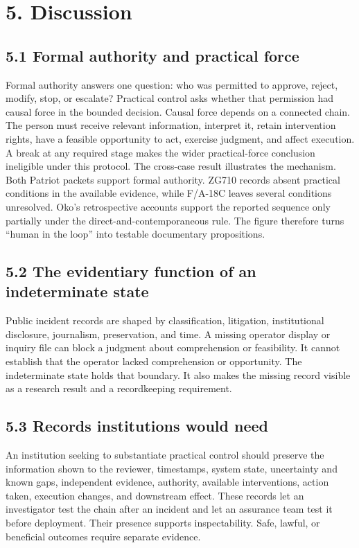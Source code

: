 \documentclass[11pt]{article}
\begin{document}
\section*{5. Discussion}
\subsection*{5.1 Formal authority and practical force}
Formal authority answers one question: who was permitted to approve, reject, modify, stop, or escalate? Practical control asks whether that permission had causal force in the bounded decision. Causal force depends on a connected chain. The person must receive relevant information, interpret it, retain intervention rights, have a feasible opportunity to act, exercise judgment, and affect execution. A break at any required stage makes the wider practical-force conclusion ineligible under this protocol.
The cross-case result illustrates the mechanism. Both Patriot packets support formal authority. ZG710 records absent practical conditions in the available evidence, while F/A-18C leaves several conditions unresolved. Oko's retrospective accounts support the reported sequence only partially under the direct-and-contemporaneous rule. The figure therefore turns “human in the loop” into testable documentary propositions.
\subsection*{5.2 The evidentiary function of an indeterminate state}
Public incident records are shaped by classification, litigation, institutional disclosure, journalism, preservation, and time. A missing operator display or inquiry file can block a judgment about comprehension or feasibility. It cannot establish that the operator lacked comprehension or opportunity. The indeterminate state holds that boundary. It also makes the missing record visible as a research result and a recordkeeping requirement.
\subsection*{5.3 Records institutions would need}
An institution seeking to substantiate practical control should preserve the information shown to the reviewer, timestamps, system state, uncertainty and known gaps, independent evidence, authority, available interventions, action taken, execution changes, and downstream effect. These records let an investigator test the chain after an incident and let an assurance team test it before deployment. Their presence supports inspectability. Safe, lawful, or beneficial outcomes require separate evidence.
\end{document}
